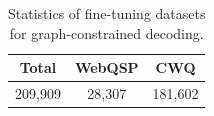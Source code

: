 \begin{table}[htb]
    \centering
    \caption{Statistics of fine-tuning datasets for graph-constrained decoding.}
    \label{tab:it-data}
    \begin{tabular}{@{}ccc@{}}
        \toprule
        Total & WebQSP & CWQ \\ \midrule
        209,909     & 28,307                  & 181,602                \\ \bottomrule
    \end{tabular}%
\end{table}